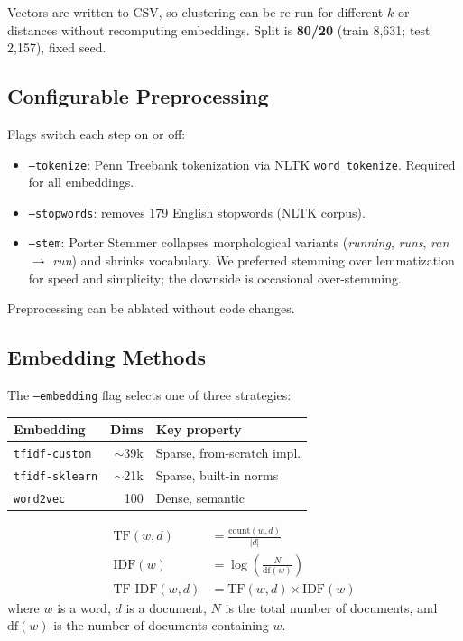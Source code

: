 \documentclass[twocolumn]{article}
\begin{document}
Vectors are written to CSV, so clustering can be re-run for different $k$ or distances without recomputing embeddings. Split is \textbf{80/20} (train 8,631; test 2,157), fixed seed.

\subsection{Configurable Preprocessing}

Flags switch each step on or off:

\begin{itemize}
    \item \texttt{--tokenize}: Penn Treebank tokenization via NLTK \texttt{word\_tokenize}. Required for all embeddings.
    \item \texttt{--stopwords}: removes 179 English stopwords (NLTK corpus).
    \item \texttt{--stem}: Porter Stemmer collapses morphological variants (\textit{running}, \textit{runs}, \textit{ran} $\rightarrow$ \textit{run}) and shrinks vocabulary. We preferred stemming over lemmatization for speed and simplicity; the downside is occasional over-stemming.
\end{itemize}

Preprocessing can be ablated without code changes.

\subsection{Embedding Methods}

The \texttt{--embedding} flag selects one of three strategies:

\begin{table}[H]
\centering
\small
\begin{tabular}{lrl}
\toprule
\textbf{Embedding} & \textbf{Dims} & \textbf{Key property} \\
\midrule
\texttt{tfidf-custom}   & $\sim$39k & Sparse, from-scratch impl. \\
\texttt{tfidf-sklearn}  & $\sim$21k & Sparse, built-in norms \\
\texttt{word2vec}        & 100       & Dense, semantic \\
\bottomrule
\end{tabular}
\label{tab:embeddings}
\end{table}

\begin{align*}
    \mathrm{TF}(w, d)      &= \frac{\mathrm{count}(w, d)}{|d|} \\
    \mathrm{IDF}(w)        &= \log\left(\frac{N}{\mathrm{df}(w)}\right) \\
    \mathrm{TF\text{-}IDF}(w, d) &= \mathrm{TF}(w, d) \times \mathrm{IDF}(w)
\end{align*}
where $w$ is a word, $d$ is a document, $N$ is the total number of documents, and $\mathrm{df}(w)$ is the number of documents containing $w$.
\end{document}
